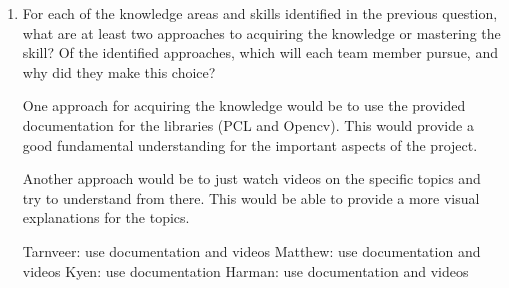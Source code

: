 \begin{enumerate}
\item For each of the knowledge areas and skills identified in the previous question, what are at least two approaches to acquiring the knowledge or mastering the skill?  Of the identified approaches, which
will each team member pursue, and why did they make this choice?

One approach for acquiring the knowledge would be to use the provided documentation for the libraries (PCL and Opencv). This would provide a good fundamental understanding for the important aspects of the project. 

Another approach would be to just watch videos on the specific topics and try to understand from there. This would be able to provide a more visual explanations for the topics.

Tarnveer: use documentation and videos
Matthew: use documentation and videos 
Kyen: use documentation
Harman: use documentation and videos

\end{enumerate}